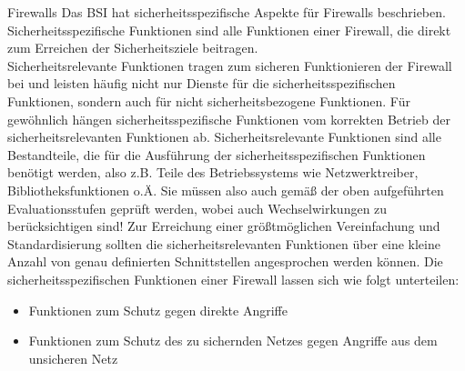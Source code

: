  \pagebreak
 \label{Firewalls}
 \begin{section}{Firewalls}
	Das BSI hat sicherheitsspezifische Aspekte für Firewalls beschrieben.
	Sicherheitsspezifische Funktionen sind alle Funktionen einer Firewall, 
	die direkt zum Erreichen der Sicherheitsziele beitragen. \\
	
	Sicherheitsrelevante Funktionen tragen zum sicheren Funktionieren der Firewall 
	bei und leisten häufig nicht nur Dienste für die sicherheitsspezifischen Funktionen, 
	sondern auch für nicht sicherheitsbezogene Funktionen. Für gewöhnlich hängen 
	sicherheitsspezifische Funktionen vom korrekten Betrieb der sicherheitsrelevanten Funktionen ab. 
	Sicherheitsrelevante Funktionen sind alle Bestandteile, die für die Ausführung der 
	sicherheitsspezifischen Funktionen benötigt werden, also z.B. 
	Teile des Betriebssystems wie Netzwerktreiber, Bibliotheksfunktionen o.Ä. 
	Sie müssen also auch gemäß der oben aufgeführten Evaluationsstufen geprüft werden, 
	wobei auch Wechselwirkungen zu berücksichtigen sind! 
	Zur Erreichung einer größtmöglichen Vereinfachung und Standardisierung sollten die 
	sicherheitsrelevanten Funktionen über eine kleine Anzahl von genau definierten Schnittstellen 
	angesprochen werden können.
	Die sicherheitsspezifischen Funktionen einer Firewall lassen sich wie folgt unterteilen:
	\begin{itemize}
		\item Funktionen zum Schutz gegen direkte Angriffe
		\item Funktionen zum Schutz des zu sichernden Netzes gegen Angriffe aus dem unsicheren Netz
	\end{itemize}
	\pagebreak
	

\end{section}
